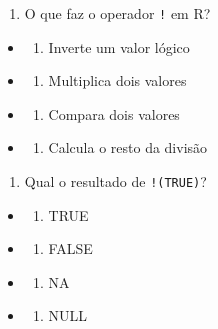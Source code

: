 \documentclass[
]{book}
\providecommand{\tightlist}{%
  \setlength{\itemsep}{0pt}\setlength{\parskip}{0pt}}
\begin{document}
\begin{enumerate}
\def\labelenumi{\arabic{enumi}.}
\setcounter{enumi}{5}
\tightlist
\item
  O que faz o operador \texttt{!} em R?
\end{enumerate}

\begin{itemize}
\tightlist
\item
  \begin{enumerate}
  \def\labelenumi{\alph{enumi})}
  \tightlist
  \item
    Inverte um valor lógico
  \end{enumerate}
\item
  \begin{enumerate}
  \def\labelenumi{\alph{enumi})}
  \setcounter{enumi}{1}
  \tightlist
  \item
    Multiplica dois valores
  \end{enumerate}
\item
  \begin{enumerate}
  \def\labelenumi{\alph{enumi})}
  \setcounter{enumi}{2}
  \tightlist
  \item
    Compara dois valores
  \end{enumerate}
\item
  \begin{enumerate}
  \def\labelenumi{\alph{enumi})}
  \setcounter{enumi}{3}
  \tightlist
  \item
    Calcula o resto da divisão
  \end{enumerate}
\end{itemize}

\begin{enumerate}
\def\labelenumi{\arabic{enumi}.}
\setcounter{enumi}{6}
\tightlist
\item
  Qual o resultado de \texttt{!(TRUE)}?
\end{enumerate}

\begin{itemize}
\tightlist
\item
  \begin{enumerate}
  \def\labelenumi{\alph{enumi})}
  \tightlist
  \item
    TRUE
  \end{enumerate}
\item
  \begin{enumerate}
  \def\labelenumi{\alph{enumi})}
  \setcounter{enumi}{1}
  \tightlist
  \item
    FALSE
  \end{enumerate}
\item
  \begin{enumerate}
  \def\labelenumi{\alph{enumi})}
  \setcounter{enumi}{2}
  \tightlist
  \item
    NA
  \end{enumerate}
\item
  \begin{enumerate}
  \def\labelenumi{\alph{enumi})}
  \setcounter{enumi}{3}
  \tightlist
  \item
    NULL
  \end{enumerate}
\end{itemize}
\end{document}
